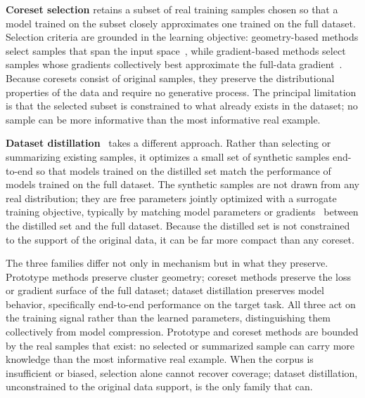 \begin{foldable}
  \textbf{Coreset selection} retains a subset of real training samples chosen so that a model trained on the subset closely approximates one trained on the full dataset.
  Selection criteria are grounded in the learning objective: geometry-based methods select samples that span the input space~\cite{sener2018active}, while gradient-based methods select samples whose gradients collectively best approximate the full-data gradient~\cite{mirzasoleiman2020coresets}.
  Because coresets consist of original samples, they preserve the distributional properties of the data and require no generative process.
  The principal limitation is that the selected subset is constrained to what already exists in the dataset; no sample can be more informative than the most informative real example.
\end{foldable}

\begin{foldable}
  \textbf{Dataset distillation}~\cite{wang2018dataset} takes a different approach.
  Rather than selecting or summarizing existing samples, it optimizes a small set of synthetic samples end-to-end so that models trained on the distilled set match the performance of models trained on the full dataset.
  The synthetic samples are not drawn from any real distribution; they are free parameters jointly optimized with a surrogate training objective, typically by matching model parameters or gradients~\cite{zhao2021dataset} between the distilled set and the full dataset.
  Because the distilled set is not constrained to the support of the original data, it can be far more compact than any coreset.
\end{foldable}

\begin{foldable}
  The three families differ not only in mechanism but in what they preserve.
  Prototype methods preserve cluster geometry; coreset methods preserve the loss or gradient surface of the full dataset; dataset distillation preserves model behavior, specifically end-to-end performance on the target task.
  All three act on the training signal rather than the learned parameters, distinguishing them collectively from model compression.
  Prototype and coreset methods are bounded by the real samples that exist: no selected or summarized sample can carry more knowledge than the most informative real example.
  When the corpus is insufficient or biased, selection alone cannot recover coverage; dataset distillation, unconstrained to the original data support, is the only family that can.
\end{foldable}

